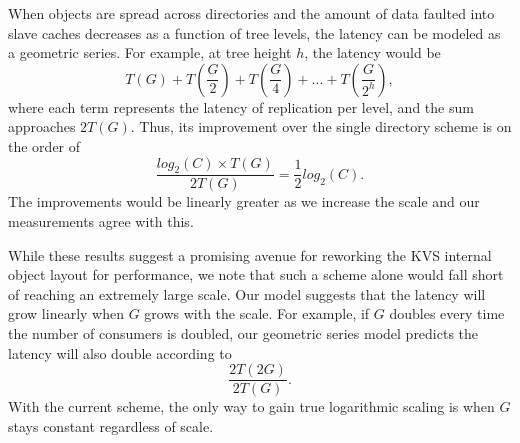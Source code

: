 When objects are spread across directories and the amount of data
faulted into slave caches decreases as a function of tree levels, 
the latency can be modeled as a geometric series.
For example, at tree height $h$, the latency would be 
\begin{equation}
T(G) + T(\frac{G}{2}) + T(\frac{G}{4}) + ... + T(\frac{G}{2^h}),
\end{equation}
where each term represents the latency of replication per level,
and the sum approaches $2T(G)$. Thus, its improvement over the single
directory scheme is on the order of 
\begin{equation}
\frac{log_2(C) \times T(G)}{2 T(G)} = \frac{1}{2}log_2(C).
\end{equation}
The improvements would be linearly 
greater as we increase the scale and our measurements agree with this. 

While these results suggest a promising avenue for reworking the KVS internal
object layout for performance, we note that such a scheme alone
would fall short of reaching an extremely large scale.
Our model suggests that the latency will grow linearly when $G$ grows
with the scale. For example, if $G$ doubles every time the number of
consumers is doubled, our geometric series model predicts the latency will
also double according to
\begin{equation}
\frac{2T(2G)}{2T(G)}.
\end{equation}
With the current scheme, the only way to gain true logarithmic
scaling is when $G$ stays constant regardless of scale. 
